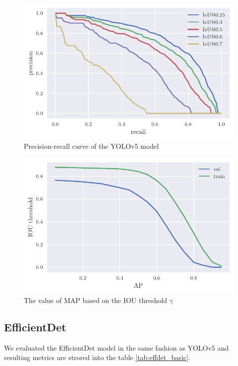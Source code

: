 \begin{paracol}{2}
    \begin{figure}
        \includegraphics[width=\linewidth]{images/iou_val_multiple.pdf}
        \caption{Precision-recall curve of the YOLOv5 model}
        \label{fig:yolov5_pr_curves}
    \end{figure}
    \switchcolumn
    \begin{figure}
        \includegraphics[width=\linewidth]{images/iou_threshold.pdf}
        \caption{The value of MAP based on the IOU threshold $\gamma$}
        \label{fig:yolov5_map_iou_thresholds}
    \end{figure}
\end{paracol}

\subsection{EfficientDet}
We evaluated the EfficientDet model in the same fashion as YOLOv5 and resulting metrics are strored into the table \ref{tab:effdet_basic}.


